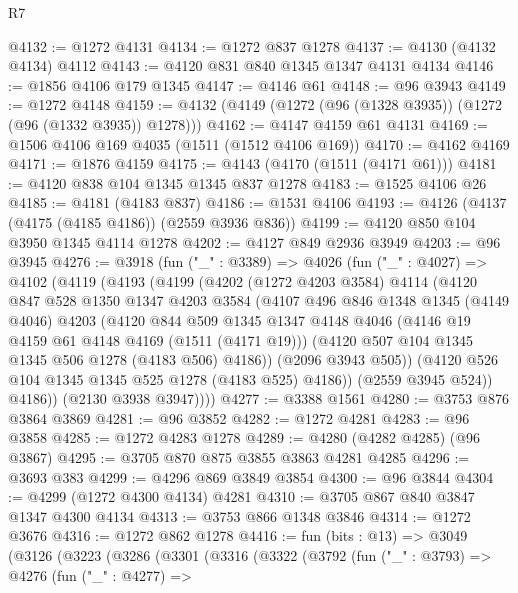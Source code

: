 \begin{lexlean}{R7}
\begin{coremodule}
@4132 := @1272 @4131
@4134 := @1272 @837 @1278
@4137 := @4130 (@4132 @4134) @4112
@4143 := @4120 @831 @840 @1345 @1347 @4131 @4134
@4146 := @1856 @4106 @179 @1345
@4147 := @4146 @61
@4148 := @96 @3943
@4149 := @1272 @4148
@4159 := @4132 (@4149 (@1272 (@96 (@1328 @3935)) (@1272 (@96 (@1332 @3935)) @1278)))
@4162 := @4147 @4159 @61 @4131
@4169 := @1506 @4106 @169 @4035 (@1511 (@1512 @4106 @169))
@4170 := @4162 @4169
@4171 := @1876 @4159
@4175 := @4143 (@4170 (@1511 (@4171 @61)))
@4181 := @4120 @838 @104 @1345 @1345 @837 @1278
@4183 := @1525 @4106 @26
@4185 := @4181 (@4183 @837)
@4186 := @1531 @4106
@4193 := @4126 (@4137 (@4175 (@4185 @4186)) (@2559 @3936 @836))
@4199 := @4120 @850 @104 @3950 @1345 @4114 @1278
@4202 := @4127 @849 @2936 @3949
@4203 := @96 @3945
@4276 := @3918
    (fun ("_" : @3389) =>
    @4026
      (fun ("_" : @4027) =>
      @4102
        (@4119
          (@4193
            (@4199
              (@4202
                (@1272 @4203 @3584)
                @4114
                (@4120
                  @847
                  @528
                  @1350
                  @1347
                  @4203
                  @3584
                  (@4107
                    @496
                    @846
                    @1348
                    @1345
                    (@4149 @4046)
                    @4203
                    (@4120
                      @844
                      @509
                      @1345
                      @1347
                      @4148
                      @4046
                      (@4146 @19 @4159 @61 @4148 @4169 (@1511 (@4171 @19)))
                      (@4120 @507 @104 @1345 @1345 @506 @1278 (@4183 @506) @4186))
                    (@2096 @3943 @505))
                  (@4120 @526 @104 @1345 @1345 @525 @1278 (@4183 @525) @4186))
                (@2559 @3945 @524))
              @4186))
          (@2130 @3938 @3947))))
@4277 := @3388 @1561
@4280 := @3753 @876 @3864 @3869
@4281 := @96 @3852
@4282 := @1272 @4281
@4283 := @96 @3858
@4285 := @1272 @4283 @1278
@4289 := @4280 (@4282 @4285) (@96 @3867)
@4295 := @3705 @870 @875 @3855 @3863 @4281 @4285
@4296 := @3693 @383
@4299 := @4296 @869 @3849 @3854
@4300 := @96 @3844
@4304 := @4299 (@1272 @4300 @4134) @4281
@4310 := @3705 @867 @840 @3847 @1347 @4300 @4134
@4313 := @3753 @866 @1348 @3846
@4314 := @1272 @3676
@4316 := @1272 @862 @1278
@4416 := fun (bits : @13) =>
  @3049
    (@3126
      (@3223
        (@3286
          (@3301
            (@3316
              (@3322
                (@3792
                  (fun ("_" : @3793) =>
                  @4276
                    (fun ("_" : @4277) =>

\end{coremodule}
\end{lexlean}
